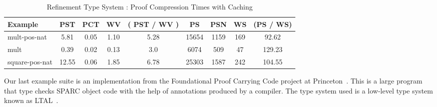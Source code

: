 \documentclass{llncs}
\begin{document}
\begin{table*}[htbp]
\begin{center}
\begin{small}
\begin{tabular}{|l|c|c|c|c|c|c|c|c|}
\hline
Example & PST 
& PCT & WV & ( PST / WV ) & PS & PSN & WS & (PS / WS)\\
\hline
mult-pos-nat & 5.81 & 0.05 & 1.10 & 5.28
& 15654 & 1159 & 169 & 92.62\\
mult & 0.39 & 0.02 & 0.13 & 3.0 
& 6074 & 509 & 47 & 129.23\\
square-pos-nat & 12.55 & 0.06 & 1.85 & 6.78 
& 25303 & 1587 & 242 & 104.55\\
\hline
\end{tabular}
\end{small}
\end{center}
\caption{\label{tab:reftimes} Refinement Type System : 
Proof Compression Times with Caching}
\end{table*}

Our last example suite is an implementation from the Foundational 
Proof Carrying Code project at Princeton~\cite{Appel01lics}. This 
is a large program that type checks SPARC object code with the help 
of annotations produced by a compiler. The type system used is a
low-level type system known as LTAL~\cite{chen+:fpcc-ltal}.
\end{document}
